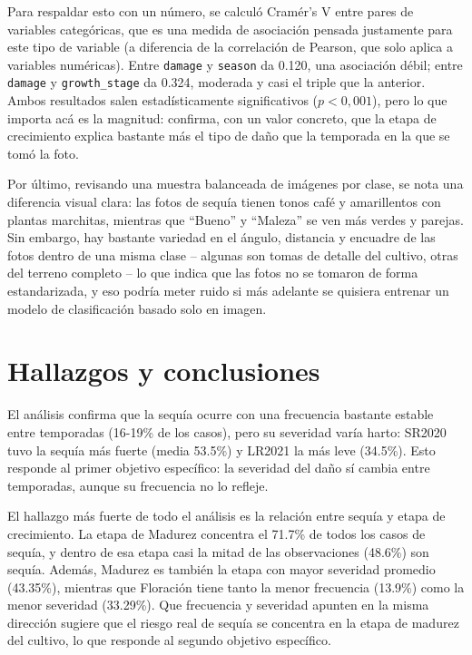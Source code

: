 \documentclass[11pt]{article}
\begin{document}
Para respaldar esto con un número, se calculó Cramér's V entre pares de variables categóricas, que es una medida de asociación pensada justamente para este tipo de variable (a diferencia de la correlación de Pearson, que solo aplica a variables numéricas). Entre \texttt{damage} y \texttt{season} da 0.120, una asociación débil; entre \texttt{damage} y \texttt{growth\_stage} da 0.324, moderada y casi el triple que la anterior. Ambos resultados salen estadísticamente significativos ($p < 0{,}001$), pero lo que importa acá es la magnitud: confirma, con un valor concreto, que la etapa de crecimiento explica bastante más el tipo de daño que la temporada en la que se tomó la foto.

Por último, revisando una muestra balanceada de imágenes por clase, se nota una diferencia visual clara: las fotos de sequía tienen tonos café y amarillentos con plantas marchitas, mientras que ``Bueno'' y ``Maleza'' se ven más verdes y parejas. Sin embargo, hay bastante variedad en el ángulo, distancia y encuadre de las fotos dentro de una misma clase -- algunas son tomas de detalle del cultivo, otras del terreno completo -- lo que indica que las fotos no se tomaron de forma estandarizada, y eso podría meter ruido si más adelante se quisiera entrenar un modelo de clasificación basado solo en imagen.

\section{Hallazgos y conclusiones}

El análisis confirma que la sequía ocurre con una frecuencia bastante estable entre temporadas (16-19\% de los casos), pero su severidad varía harto: SR2020 tuvo la sequía más fuerte (media 53.5\%) y LR2021 la más leve (34.5\%). Esto responde al primer objetivo específico: la severidad del daño sí cambia entre temporadas, aunque su frecuencia no lo refleje.

El hallazgo más fuerte de todo el análisis es la relación entre sequía y etapa de crecimiento. La etapa de Madurez concentra el 71.7\% de todos los casos de sequía, y dentro de esa etapa casi la mitad de las observaciones (48.6\%) son sequía. Además, Madurez es también la etapa con mayor severidad promedio (43.35\%), mientras que Floración tiene tanto la menor frecuencia (13.9\%) como la menor severidad (33.29\%). Que frecuencia y severidad apunten en la misma dirección sugiere que el riesgo real de sequía se concentra en la etapa de madurez del cultivo, lo que responde al segundo objetivo específico.
\end{document}
